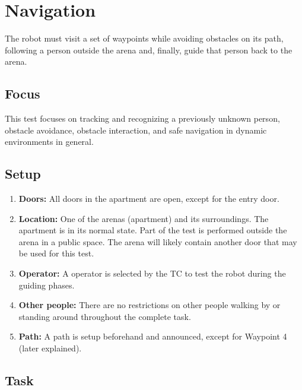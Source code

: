 \section{Navigation}
\label{test:navigation}
The robot must visit a set of waypoints while avoiding obstacles on its path, following a person outside the arena and, finally, guide that person back to the arena.

\subsection{Focus}
This test focuses on tracking and recognizing a previously unknown person, obstacle avoidance, obstacle interaction, and safe navigation in dynamic environments in general.

\subsection{Setup}

\begin{enumerate}
	\item \textbf{Doors:} All doors in the apartment are open, except for the entry door. 
	\item \textbf{Location:} One of the arenas (apartment) and its surroundings. The apartment is in its normal state. Part of the test is performed outside the arena in a public space.
	The arena will likely contain another door that may be used for this test.
	\item \textbf{Operator:} A  operator is selected by the TC to test the robot during the guiding phases.
	\item \textbf{Other people:} There are no restrictions on other people walking by or standing around throughout the complete task.
	\item \textbf{Path:} A path is setup beforehand and announced, except for Waypoint 4 (later explained).
\end{enumerate}

\subsection{Task}
%
%

